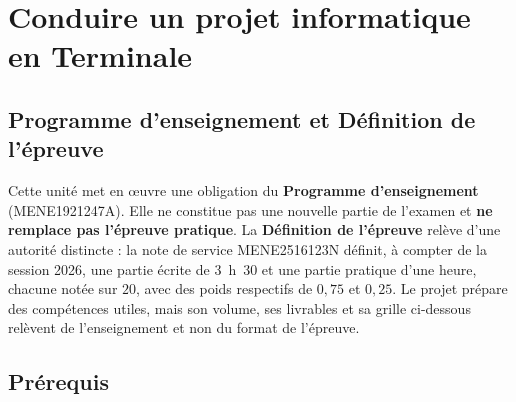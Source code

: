 
\section{Conduire un projet informatique en Terminale}



\subsection*{Programme d'enseignement et Définition de l'épreuve}

Cette unité met en œuvre une obligation du \textbf{Programme d'enseignement}
(MENE1921247A). Elle ne constitue pas une nouvelle partie de l'examen et
\textbf{ne remplace pas l'épreuve pratique}. La \textbf{Définition de l'épreuve} relève
d'une autorité distincte : la note de service MENE2516123N définit, à compter de la
session 2026, une partie écrite de $3$~h~$30$ et une partie pratique d'une heure, chacune
notée sur $20$, avec des poids respectifs de $0{,}75$ et $0{,}25$. Le projet prépare des
compétences utiles, mais son volume, ses livrables et sa grille ci-dessous relèvent de
l'enseignement et non du format de l'épreuve.

\subsection*{Prérequis}

